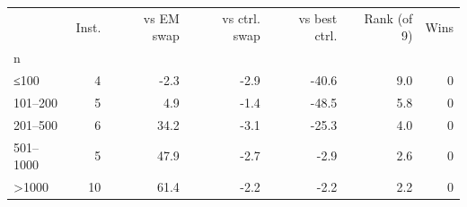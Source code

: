 \begin{tabular}{lrrrrrr}
\toprule
 & Inst. & vs EM swap & vs ctrl. swap & vs best ctrl. & Rank (of 9) & Wins \\
n &  &  &  &  &  &  \\
\midrule
≤100 & 4 & -2.3 & -2.9 & -40.6 & 9.0 & 0 \\
101–200 & 5 & 4.9 & -1.4 & -48.5 & 5.8 & 0 \\
201–500 & 6 & 34.2 & -3.1 & -25.3 & 4.0 & 0 \\
501–1000 & 5 & 47.9 & -2.7 & -2.9 & 2.6 & 0 \\
>1000 & 10 & 61.4 & -2.2 & -2.2 & 2.2 & 0 \\
\bottomrule
\end{tabular}
